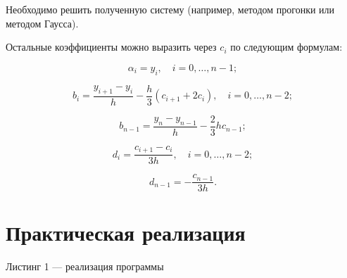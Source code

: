 \documentclass[a4paper, 14pt]{extarticle}
\begin{document}
\begin{flushleft}
Необходимо решить полученную систему (например, методом прогонки или методом Гаусса).

Остальные коэффициенты можно выразить через \( c_i \) по следующим формулам:

\[
\alpha_i = y_i, \quad i = 0, \dots, n-1;
\]

\[
b_i = \frac{y_{i+1} - y_i}{h} - \frac{h}{3} (c_{i+1} + 2c_i), \quad i = 0, \dots, n-2;
\]

\[
b_{n-1} = \frac{y_n - y_{n-1}}{h} - \frac{2}{3} h c_{n-1};
\]

\[
d_i = \frac{c_{i+1} - c_i}{3h}, \quad i = 0, \dots, n-2;
\]

\[
d_{n-1} = -\frac{c_{n-1}}{3h}.
\]
\end{flushleft}
\pagebreak

\section{Практическая реализация}
Листинг 1 — реализация программы
\end{document}
